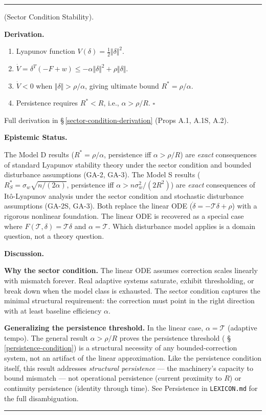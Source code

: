 \documentclass[11pt,oneside]{article}
\newcounter{claim}[section]
\renewcommand{\theclaim}{\thesection.\arabic{claim}}
\newenvironment{segment}[2]{%
  \refstepcounter{claim}%
  \bigskip\noindent\hrule\smallskip
  \noindent{\bfseries #1~\theclaim}\enskip(#2).\par\smallskip
  \noindent\ignorespaces
}{%
  \par\smallskip\noindent\hrule\bigskip
}
\newenvironment{theorem}[1][]{\begin{segment}{Theorem}{#1}}{\end{segment}}
\begin{document}
\begin{theorem}[Sector Condition Stability]
\medskip\noindent\textbf{Derivation.}


\begin{enumerate}
  \item Lyapunov function $V(\delta) = \frac{1}{2}\Vert\delta\Vert^2$.
  \item $\dot{V} = \delta^T(-F + w) \leq -\alpha\Vert\delta\Vert^2 + \rho\Vert\delta\Vert$.
  \item $\dot{V} < 0$ when $\Vert\delta\Vert > \rho/\alpha$, giving ultimate bound $R^* = \rho/\alpha$.
  \item Persistence requires $R^* < R$, i.e., $\alpha > \rho/R$. $\square$
\end{enumerate}


Full derivation in \S\,\ref{sector-condition-derivation} (Props A.1, A.1S, A.2).


\medskip\noindent\textbf{Epistemic Status.}


The Model D results ($R^* = \rho/\alpha$, persistence iff $\alpha > \rho/R$) are \textit{exact} consequences of standard Lyapunov stability theory under the sector condition and bounded disturbance assumptions (GA-2, GA-3). The Model S results ($R^*_S = \sigma_w\sqrt{n/(2\alpha)}$, persistence iff $\alpha > n\sigma_w^2/(2R^2)$) are \textit{exact} consequences of Itô-Lyapunov analysis under the sector condition and stochastic disturbance assumptions (GA-2S, GA-3). Both replace the linear ODE ($\dot{\delta} = -\mathcal{T}\delta + \rho$) with a rigorous nonlinear foundation. The linear ODE is recovered as a special case where $F(\mathcal{T}, \delta) = \mathcal{T}\delta$ and $\alpha = \mathcal{T}$. Which disturbance model applies is a domain question, not a theory question.


\medskip\noindent\textbf{Discussion.}


\textbf{Why the sector condition.} The linear ODE assumes correction scales linearly with mismatch forever. Real adaptive systems saturate, exhibit thresholding, or break down when the model class is exhausted. The sector condition captures the minimal structural requirement: the correction must point in the right direction with at least baseline efficiency $\alpha$.

\textbf{Generalizing the persistence threshold.} In the linear case, $\alpha = \mathcal{T}$ (adaptive tempo). The general result $\alpha > \rho/R$ proves the persistence threshold ( \S\,\ref{persistence-condition}) is a structural necessity of any bounded-correction system, not an artifact of the linear approximation. Like the persistence condition itself, this result addresses \textit{structural persistence} — the machinery's capacity to bound mismatch — not operational persistence (current proximity to $R$) or continuity persistence (identity through time). See Persistence in \texttt{LEXICON.md} for the full disambiguation.


\end{theorem}
\end{document}
